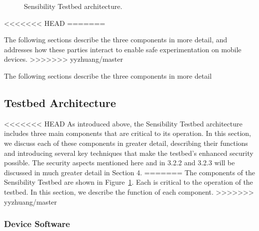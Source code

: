 {\begin{figure}
\caption{\small Sensibility Testbed architecture. \label{fig-arch}}
\end{figure}

<<<<<<< HEAD
=======

\smallskip
The following sections describe the three components in more detail, and 
addresses how these parties interact to enable safe experimentation on 
mobile devices. 
>>>>>>> yyzhuang/master

\smallskip
The following sections describe the three components in more detail


\subsection{Testbed Architecture}\label{sec-component}

<<<<<<< HEAD
As introduced above, the Sensibility Testbed architecture includes three main components that are critical to its operation. In this section, we discuss each of these components in greater detail, describing their functions and introducing several key techniques that make the testbed's enhanced security possible. The security aspects mentioned here and in 3.2.2 and 3.2.3 will be discussed in much greater detail in Section 4.
=======
The components of the Sensibility Testbed are shown in Figure~\ref{fig-arch}.
Each is critical to the operation of the testbed. 
In this section, we describe the function of each component.
>>>>>>> yyzhuang/master

\subsubsection{Device Software}\label{sec-repy}

}
